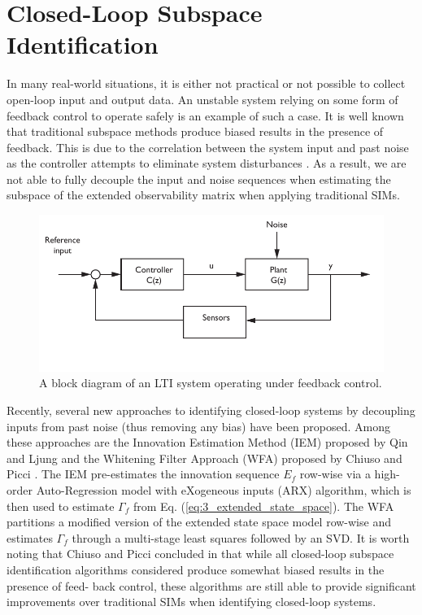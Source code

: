 \section{Closed-Loop Subspace Identification}
In many real-world situations, it is either not practical or not possible to collect open-loop input and output data. An unstable system relying on some form of feedback control to operate safely is an example of such a case. It is well known that traditional subspace methods produce biased results in the presence of feedback. This is due to the correlation between the system input and past noise as the controller attempts to eliminate system disturbances \cite{qin2006overview}. As a result, we are not able to fully decouple the input and noise sequences when estimating the subspace of the extended observability matrix when applying traditional SIMs.
\begin{figure}[htb!]
	\centering
	\includegraphics{../fig/closed_loop_block_diagram.pdf}
	\caption{A block diagram of an LTI system operating under feedback control.}
\end{figure}

Recently, several new approaches to identifying closed-loop systems by decoupling inputs from past noise (thus removing any bias) have been proposed. Among these approaches are the Innovation Estimation Method (IEM) proposed by Qin and Ljung \cite{qin2003closed} and the Whitening Filter Approach (WFA) proposed by Chiuso and Picci \cite{chiuso2005consistency}. The IEM pre-estimates the innovation sequence $E_f$ row-wise via a high-order Auto-Regression model with eXogeneous inputs (ARX) algorithm, which is then used to estimate $\Gamma_f$ from Eq. (\ref{eq:3_extended_state_space}). The WFA partitions a modified version of the extended state space model row-wise and estimates $\Gamma_f$ through a multi-stage least squares followed by an SVD. It is worth noting that Chiuso and Picci concluded in \cite{chiuso2005consistency} that while all closed-loop subspace identification algorithms considered produce somewhat biased results in the presence of feed- back control, these algorithms are still able to provide significant improvements over traditional SIMs when identifying closed-loop systems.

